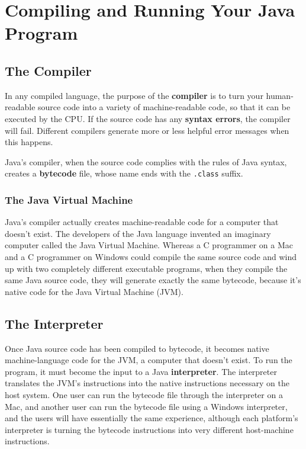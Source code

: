 
\chapter{Compiling and Running Your Java Program}
\label{appendix:compiling}

\minitoc

\section{The Compiler}

In any compiled language, the purpose of the \textbf{compiler} is to turn your human-readable source code into a variety of machine-readable code, so that it can be executed by the CPU.  If the source code has any \textbf{syntax errors}, the compiler will fail.  Different compilers generate more or less helpful error messages when this happens.

Java's compiler, when the source code complies with the rules of Java syntax, creates a \textbf{bytecode} file, whose name ends with the \verb-.class- suffix.

\subsection{The Java Virtual Machine}
Java's compiler actually creates machine-readable code for a computer that doesn't exist.  The developers of the Java language invented an imaginary computer called the Java Virtual Machine.  Whereas a C programmer on a Mac and a C programmer on Windows could compile the same source code and wind up with two completely different executable programs, when they compile the same Java source code, they will generate exactly the same bytecode, because it's native code for the Java Virtual Machine (JVM).

\section{The Interpreter}

Once Java source code has been compiled to bytecode, it becomes native machine-language code for the JVM, a computer that doesn't exist.  To run the program, it must become the input to a Java \textbf{interpreter}.  The interpreter translates the JVM's instructions into the native instructions necessary on the host system.  One user can run the bytecode file through the interpreter on a Mac, and another user can run the bytecode file using a Windows interpreter, and the users will have essentially the same experience, although each platform's interpreter is turning the bytecode instructions into very different host-machine instructions.

